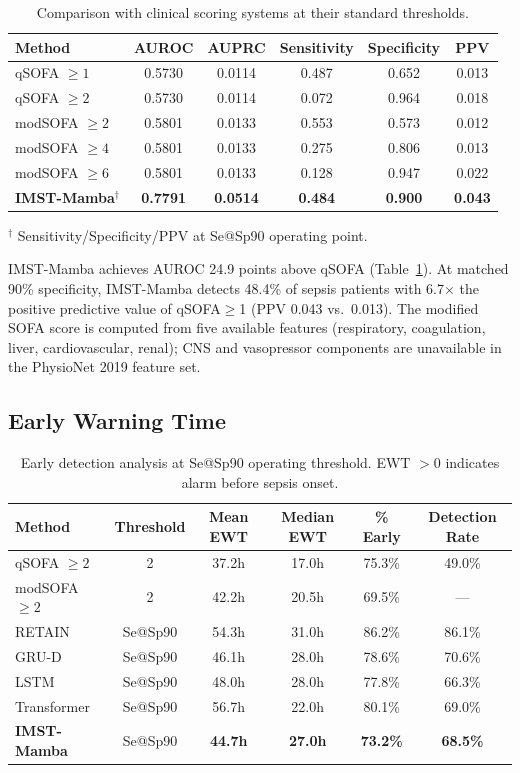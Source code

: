 \documentclass[twoside,11pt]{article}
\begin{document}
\begin{table}[t]
\caption{Comparison with clinical scoring systems at their standard thresholds.}
\label{tab:clinical}
\centering
\begin{tabular}{lccccc}
\toprule
Method & AUROC & AUPRC & Sensitivity & Specificity & PPV \\
\midrule
qSOFA $\geq 1$ & 0.5730 & 0.0114 & 0.487 & 0.652 & 0.013 \\
qSOFA $\geq 2$ & 0.5730 & 0.0114 & 0.072 & 0.964 & 0.018 \\
modSOFA $\geq 2$ & 0.5801 & 0.0133 & 0.553 & 0.573 & 0.012 \\
modSOFA $\geq 4$ & 0.5801 & 0.0133 & 0.275 & 0.806 & 0.013 \\
modSOFA $\geq 6$ & 0.5801 & 0.0133 & 0.128 & 0.947 & 0.022 \\
\midrule
\textbf{IMST-Mamba}$^\dagger$ & \textbf{0.7791} & \textbf{0.0514}
                    & \textbf{0.484} & \textbf{0.900} & \textbf{0.043} \\
\bottomrule
\end{tabular}
{\small $^\dagger$ Sensitivity/Specificity/PPV at Se@Sp90 operating point.}
\end{table}

IMST-Mamba achieves AUROC 24.9 points above qSOFA (Table~\ref{tab:clinical}).
At matched 90\% specificity, IMST-Mamba detects 48.4\% of sepsis patients
with 6.7$\times$ the positive predictive value of qSOFA$\geq$1 (PPV 0.043
vs.\ 0.013).  The modified SOFA score is computed from five available features
(respiratory, coagulation, liver, cardiovascular, renal); CNS and vasopressor
components are unavailable in the PhysioNet 2019 feature set.

\subsection{Early Warning Time}

\begin{table}[t]
\caption{Early detection analysis at Se@Sp90 operating threshold.
EWT $>0$ indicates alarm before sepsis onset.}
\label{tab:ewt}
\centering
\begin{tabular}{lccccc}
\toprule
Method & Threshold & Mean EWT & Median EWT & \% Early & Detection Rate \\
\midrule
qSOFA $\geq 2$   & 2        & 37.2h & 17.0h & 75.3\% & 49.0\% \\
modSOFA $\geq 2$ & 2        & 42.2h & 20.5h & 69.5\% & —      \\
RETAIN           & Se@Sp90  & 54.3h & 31.0h & 86.2\% & 86.1\% \\
GRU-D            & Se@Sp90  & 46.1h & 28.0h & 78.6\% & 70.6\% \\
LSTM             & Se@Sp90  & 48.0h & 28.0h & 77.8\% & 66.3\% \\
Transformer      & Se@Sp90  & 56.7h & 22.0h & 80.1\% & 69.0\% \\
\midrule
\textbf{IMST-Mamba} & Se@Sp90 & \textbf{44.7h}
                    & \textbf{27.0h} & \textbf{73.2\%} & \textbf{68.5\%} \\
\bottomrule
\end{tabular}
\end{table}
\end{document}
